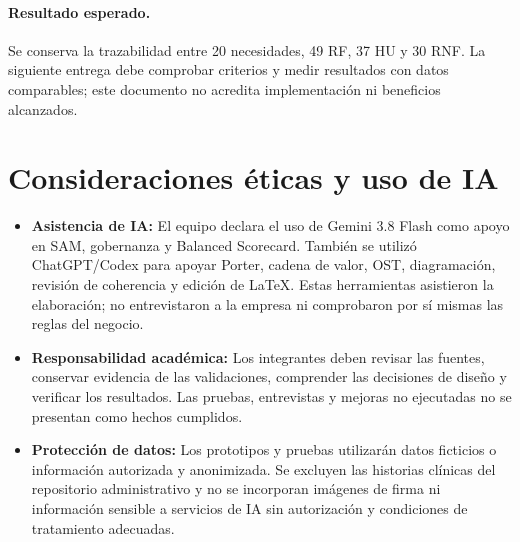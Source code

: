 \documentclass[12pt,letterpaper]{article}
\begin{document}
\paragraph{Resultado esperado.}
Se conserva la trazabilidad entre 20 necesidades, 49 RF, 37 HU y 30 RNF. La siguiente entrega debe comprobar criterios y medir resultados con datos comparables; este documento no acredita implementación ni beneficios alcanzados.


\FloatBarrier
\section{Consideraciones éticas y uso de IA}
\begin{itemize}
    \item \textbf{Asistencia de IA:} El equipo declara el uso de Gemini 3.8 Flash como apoyo en SAM, gobernanza y Balanced Scorecard. También se utilizó ChatGPT/Codex para apoyar Porter, cadena de valor, OST, diagramación, revisión de coherencia y edición de LaTeX. Estas herramientas asistieron la elaboración; no entrevistaron a la empresa ni comprobaron por sí mismas las reglas del negocio.
    \item \textbf{Responsabilidad académica:} Los integrantes deben revisar las fuentes, conservar evidencia de las validaciones, comprender las decisiones de diseño y verificar los resultados. Las pruebas, entrevistas y mejoras no ejecutadas no se presentan como hechos cumplidos.
    \item \textbf{Protección de datos:} Los prototipos y pruebas utilizarán datos ficticios o información autorizada y anonimizada. Se excluyen las historias clínicas del repositorio administrativo y no se incorporan imágenes de firma ni información sensible a servicios de IA sin autorización y condiciones de tratamiento adecuadas.
\end{itemize}
\end{document}
